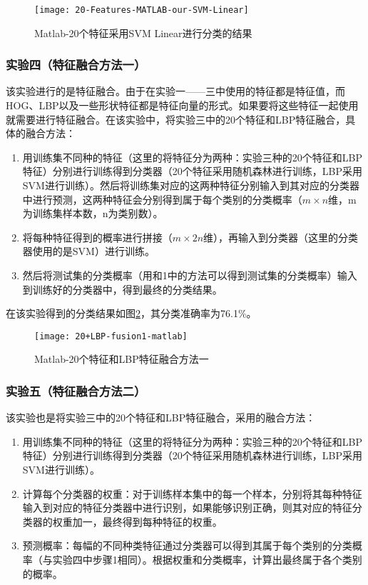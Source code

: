 \begin{figure}[!ht]
\centering
\texttt{[image: 20-Features-MATLAB-our-SVM-Linear]}
\caption{Matlab-20个特征采用SVM Linear进行分类的结果}
\label{fig:20-Features-MATLAB-our-SVM-Linear}
\end{figure}

\subsubsection{实验四（特征融合方法一）}
该实验进行的是特征融合。由于在实验一——三中使用的特征都是特征值，而HOG、LBP以及一些形状特征都是特征向量的形式。如果要将这些特征一起使用就需要进行特征融合。在该实验中，将实验三中的20个特征和LBP特征融合，具体的融合方法：
\begin{enumerate}
\item 用训练集不同种的特征（这里的将特征分为两种：实验三种的20个特征和LBP特征）分别进行训练得到分类器（20个特征采用随机森林进行训练，LBP采用SVM进行训练）。然后将训练集对应的这两种特征分别输入到其对应的分类器中进行预测，这两种特征会分别得到属于每个类别的分类概率（$m \times n$维，m为训练集样本数，n为类别数）。
\item 将每种特征得到的概率进行拼接（$m \times 2n$维），再输入到分类器（这里的分类器使用的是SVM）进行训练。
\item 然后将测试集的分类概率（用和1中的方法可以得到测试集的分类概率）输入到训练好的分类器中，得到最终的分类结果。
\end{enumerate}

在该实验得到的分类结果如图\ref{fig:20+LBP-fusion1-matlab}，其分类准确率为76.1\%。
\begin{figure}[!ht]
\centering
\texttt{[image: 20+LBP-fusion1-matlab]}
\caption{Matlab-20个特征和LBP特征融合方法一}
\label{fig:20+LBP-fusion1-matlab}
\end{figure}

\subsubsection{实验五（特征融合方法二）}
该实验也是将实验三中的20个特征和LBP特征融合，采用的融合方法：
\begin{enumerate}
\item 用训练集不同种的特征（这里的将特征分为两种：实验三种的20个特征和LBP特征）分别进行训练得到分类器（20个特征采用随机森林进行训练，LBP采用SVM进行训练）。
\item 计算每个分类器的权重：对于训练样本集中的每一个样本，分别将其每种特征输入到对应的特征分类器中进行识别，如果能够识别正确，则其对应的特征分类器的权重加一，最终得到每种特征的权重。
\item 预测概率：每幅的不同种类特征通过分类器可以得到其属于每个类别的分类概率（与实验四中步骤1相同）。根据权重和分类概率，计算出最终属于各个类别的概率。
\end{enumerate}

